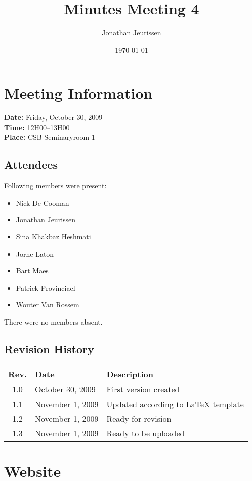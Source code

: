 \documentclass[a4paper, 12pt]{article}
\begin{document}
\title{Minutes Meeting 4}
\author{Jonathan Jeurissen}
\date{\today}

\maketitle	
	\section{Meeting Information}
			\textbf{Date:} Friday, October 30, 2009\\
			\textbf{Time:} 12H00--13H00\\
			\textbf{Place:} CSB Seminaryroom 1\\
		\subsection{Attendees}
Following members were present:
			\begin{itemize}
				\item Nick De Cooman
				\item Jonathan Jeurissen
				\item Sina Khakbaz Heshmati
				\item Jorne Laton
				\item Bart Maes
				\item Patrick Provinciael
				\item Wouter Van Rossem
			\end{itemize}
There were no members absent.
		\subsection{Revision History}
			\begin{tabular}{c | l | l }
				\textbf{Rev.} & \textbf{Date} & \textbf{Description} \\
				\hline
				1.0 & October 30, 2009 & First version created \\
				1.1 & November 1, 2009 & Updated according to \LaTeX{} template \\
				1.2 & November 1, 2009 & Ready for revision \\
				1.3 & November 1, 2009 & Ready to be uploaded \\
			\end{tabular}		
	
	\section{Website}
	
\end{document}
